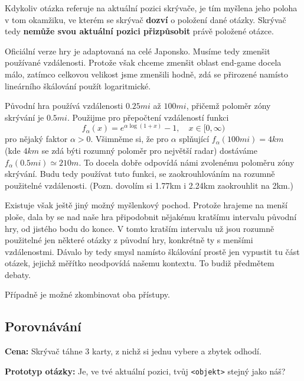 
Kdykoliv otázka referuje na aktuální pozici skrývače, je tím myšlena jeho poloha v tom okamžiku, ve kterém se skrývač \textbf{dozví} o položení dané otázky. Skrývač tedy \textbf{nemůže svou aktuální pozici přizpůsobit} právě položené otázce.

\begin{reasoning}
	Oficiální verze hry je adaptovaná na celé Japonsko. Musíme tedy zmenšit používané vzdálenosti. Protože však chceme zmenšit oblast end-game docela málo, zatímco celkovou velikost jsme zmenšili hodně, zdá se přirozené namísto lineárního škálování použít logaritmické.

	Původní hra používá vzdálenosti $0.25mi$ až $100mi$, přičemž poloměr zóny skrývání je $0.5mi$. Použijme pro přepočtení vzdáleností funkci
	\begin{equation*}
		f_\alpha(x) = e^{\alpha\log(1+x)} - 1,\quad x \in [0, \infty)
	\end{equation*}
	pro nějaký faktor $\alpha > 0$. Všimněme si, že pro $\alpha$ splňující $f_\alpha(100mi) = 4km$ (kde $4km$ se zdá býti rozumný poloměr pro největší radar) dostáváme $f_\alpha(0.5mi) \simeq 210m$. To docela dobře odpovídá námi zvolenému poloměru zóny skrývání. Budu tedy používat tuto funkci, se zaokrouhlováním na rozumně použitelné vzdálenosti. (Pozn. dovolím si 1.77km i 2.24km zaokrouhlit na 2km.)

	Existuje však ještě jiný možný myšlenkový pochod. Protože hrajeme na menší ploše, dala by se nad naše hra připodobnit nějakému kratšímu intervalu původní hry, od jistého bodu do konce. V tomto kratším intervalu už jsou rozumně použitelné jen některé otázky z původní hry, konkrétně ty s menšími vzdálenostmi. Dávalo by tedy smysl namísto škálování prostě jen vypustit tu část otázek, jejichž měřítko neodpovídá našemu kontextu. To budiž předmětem debaty.

	Případně je možné zkombinovat oba přístupy.
\end{reasoning}

\subsection{Porovnávání}

\textbf{Cena:} Skrývač táhne 3 karty, z nichž si jednu vybere a zbytek odhodí.

\textbf{Prototyp otázky:} Je, ve tvé aktuální pozici, tvůj \verb|<objekt>| stejný jako náš?


